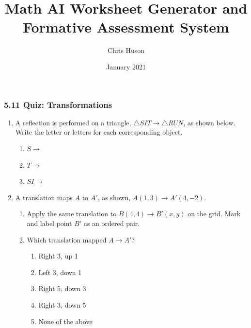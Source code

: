\documentclass[12pt, twoside]{article}
\title{Math AI Worksheet Generator and Formative Assessment System}
\author{Chris Huson}
\date{January 2021}
\begin{document}
\subsubsection*{5.11 Quiz: Transformations}
\begin{enumerate}

\item A reflection is performed on a triangle, $\triangle SIT \rightarrow \triangle RUN$, as shown below. \\[0.5cm]
Write the letter or letters for each corresponding object. \vspace{0.5cm}
  \begin{multicols}{2}

    \begin{enumerate}
      \item $S \rightarrow$ \vspace{1.5cm}
      \item $T \rightarrow$ \vspace{1.5cm}
      \item $SI \rightarrow$ \vspace{1.5cm}
    \end{enumerate}
  \end{multicols}

\newpage
\item A translation maps $A$ to $A'$, as shown, $A(1,3) \rightarrow A'(4,-2)$.
\begin{multicols}{2}
  \begin{enumerate}
    \item Apply the same translation to $B(4,4)\rightarrow B'(x,y)$ on the grid. Mark and label point $B'$ as an ordered pair.
    \item Which translation mapped $A \rightarrow A'$?
    \begin{enumerate}[label=(\Alph*)]
      \item Right 3, up 1
      \item Left 3, down 1
      \item Right 5, down 3
      \item Right 3, down 5
      \item None of the above
    \end{enumerate} \vspace{2cm}


\end{enumerate}
\end{multicols}
\end{enumerate}
\end{document}
